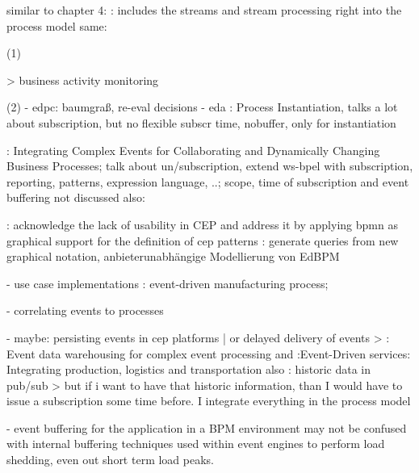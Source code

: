 similar to chapter 4:
\cite{appel2014modeling}: includes the streams and stream processing right into the process model
same: \cite{biornstad2006control}




(1)

> business activity monitoring



(2)
- edpc: baumgraß, re-eval decisions
- eda
\cite{decker2008instantiation}: Process Instantiation, talks a lot about subscription, but no flexible subscr time, nobuffer, only for instantiation

\cite{von2010integrating}: Integrating Complex Events for Collaborating and Dynamically Changing Business Processes; talk about un/subscription, extend ws-bpel with subscription, reporting, patterns, expression language, ..; scope, time of subscription and event buffering not discussed
also: \cite{juric2010wsdl}

\cite{Kunz2010}: acknowledge the lack of usability in CEP and address it by applying bpmn as graphical support for the definition of cep patterns
\cite{gabriel2016konzeptionelle}: generate queries from new graphical notation, anbieterunabhängige Modellierung von EdBPM


- use case implementations
\cite{estruch2012event}: event-driven manufacturing process; 


- correlating events to processes

- maybe: persisting events in cep platforms | or delayed delivery of events
> \cite{roth2010event}: Event data warehousing for complex event processing and \cite{buchmann2010event}:Event-Driven services: Integrating production, logistics and transportation
also \cite{li2007historic}: historic data in pub/sub
> but if i want to have that historic information, than I would have to issue a subscription some time before. I integrate everything in the process model

- event buffering for the application in a BPM environment may not be confused with internal buffering techniques used within event engines to perform load shedding, even out short term load peaks. 

